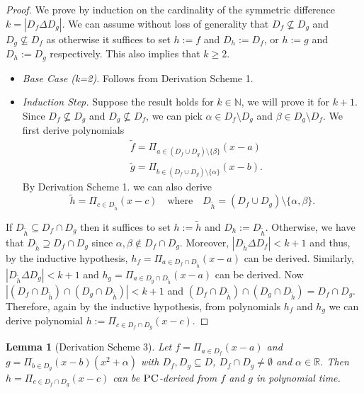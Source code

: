 \documentclass[11pt]{article}
\newcommand{\PC}{\textsc{PC}}
\newcommand{\1}{\textbf{1}}
\newtheorem{lemma}[theorem]{Lemma}
\begin{document}
\begin{proof}
    We prove by induction on the cardinality of the symmetric difference $k = |D_f \Delta D_g|$. We can assume without loss of generality that $D_f \nsubseteq D_g$ and $D_g \nsubseteq D_f$ as otherwise it suffices to set $h := f$ and $D_h := D_f$, or $h := g$ and $D_h := D_g$ respectively. This also implies that $k \geq 2$.
    \begin{itemize}
        \item \textit{Base Case (k=2).} Follows from Derivation Scheme 1.
        \item \textit{Induction Step.} Suppose the result holds for $k \in \mathbb{N}$, we will prove it for $k+1$. Since $D_f \nsubseteq D_g$ and $D_g \nsubseteq D_f$, we can pick $\alpha \in D_f \setminus D_g$ and $\beta \in D_g \setminus D_f$. We first derive polynomials
        \begin{align*}
            &\tilde{f} = \Pi_{a \in (D_f \cup D_g) \setminus \{\beta\}} (x-a)\\
            &\tilde{g} = \Pi_{b \in (D_f \cup D_g) \setminus \{ \alpha \} } (x-b).
        \end{align*}
        By Derivation Scheme 1. we can also derive
        \begin{equation*}
            \tilde{h} = \Pi_{c \in D_{\tilde{h}}} (x-c) \quad \text{where} \quad D_{\tilde{h}} = (D_f \cup D_g) \setminus \{\alpha,\beta\}.
        \end{equation*}
    \end{itemize}
    If $D_{\tilde{h}} \subseteq D_f \cap D_g$ then it suffices to set $h := \tilde{h}$ and $D_h := D_{\tilde{h}}$. Otherwise, we have that $D_{\tilde{h}} \supseteq D_f \cap D_g$ since $\alpha,\beta \notin D_f \cap D_g$. Moreover, $|D_{\tilde{h}} \Delta D_f| < k+1$ and thus, by the inductive hypothesis, $h_f = \Pi_{a \in D_f \cap D_{\tilde{h}}}(x-a)$ can be derived. Similarly, $|D_{\tilde{h}} \Delta D_g| < k+1$ and $h_g = \Pi_{a \in D_g \cap D_{\tilde{h}}}(x-a)$ can be derived. Now $|(D_f \cap D_{\tilde{h}}) \cap (D_g \cap D_{\tilde{h}})| < k+1$ and $(D_f \cap D_{\tilde{h}}) \cap (D_g \cap D_{\tilde{h}}) = D_f \cap D_g$. Therefore, again by the inductive hypothesis, from polynomials $h_f$ and $h_g$ we can derive polynomial $h := \Pi_{c \in D_f \cap D_g}(x-c)$.
\end{proof}

\begin{lemma}[Derivation Scheme 3]
    Let $f = \Pi_{a \in D_f} (x-a)$ and $g = \Pi_{b \in D_g}(x-b)(x^2 + \alpha)$ with $D_f, D_g \subseteq D$, $D_f \cap D_g \neq \emptyset$ and $\alpha \in \mathbb{R}$. Then $h = \Pi_{c \in D_f \cap D_g}(x-c)$ can be $\PC$-derived from $f$ and $g$ in polynomial time.
\end{lemma}
\end{document}
